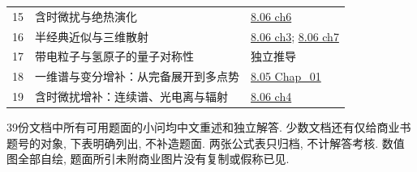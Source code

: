 \begin{longtable}{p{}p{}p{}}
15 & 含时微扰与绝热演化 & \href{https://ocw.mit.edu/courses/8-06-quantum-physics-iii-spring-2018/resources/chapter-6-adiabatic-approximation/}{8.06 ch6}\\
16 & 半经典近似与三维散射 & \href{https://ocw.mit.edu/courses/8-06-quantum-physics-iii-spring-2018/resources/chapter-3-semiclassical-approximation/}{8.06 ch3}; \href{https://ocw.mit.edu/courses/8-06-quantum-physics-iii-spring-2018/resources/chapter-7-scattering/}{8.06 ch7}\\
17 & 带电粒子与氢原子的量子对称性 & 独立推导\\
18 & 一维谱与变分增补：从完备展开到多点势 & \href{https://ocw.mit.edu/courses/8-05-quantum-physics-ii-fall-2013/resources/lecture-notes-1/}{8.05 Chap\_01}\\
19 & 含时微扰增补：连续谱、光电离与辐射 & \href{https://ocw.mit.edu/courses/8-06-quantum-physics-iii-spring-2018/resources/chapter-4-time-dependent-perturbation-theory/}{8.06 ch4}\\
\bottomrule\end{longtable}
39份文档中所有可用题面的小问均中文重述和独立解答. 少数文档还有仅给商业书题号的对象, 下表明确列出, 不补造题面. 两张公式表只归档, 不计解答考核. 数值图全部自绘, 题面所引未附商业图片没有复制或假称已见.
